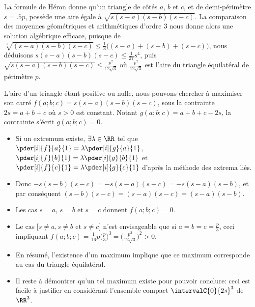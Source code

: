

\begin{remark}
	La formule de Héron donne qu'un triangle de côtés $a$, $b$ et $c$, et de demi-périmètre $s = \num{.5} p$, possède une aire égale à $\sqrt{s(s - a)(s - b)(s - c)}$.
	La comparaison des moyennes géométriques et arithmétiques d'ordre $3$ nous donne alors une solution algébrique efficace, puisque de
	$\sqrt[3]{(s - a)(s - b)(s - c)} \leq \frac13 \big( (s - a) + (s - b) + (s - c) \big)$,
	nous déduisons
	$s(s - a)(s - b)(s - c) \leq \frac{1}{27} s^4$,
	puis
	$\sqrt{s(s - a)(s - b)(s - c)} \leq \frac{p^2}{12 \sqrt{3}}$
	où $\frac{p^2}{12 \sqrt{3}}$ est l'aire du triangle équilatéral de périmètre $p$.
\end{remark}




\begin{remark} \label{constrained-extrema}
	L'aire d'un triangle étant positive ou nulle, nous pouvons chercher à maximiser son carré
	$f(a;b;c) = s(s - a)(s - b)(s - c)$,
	sous la contrainte $2s = a + b + c$ où $s > 0$ est constant.
	Notant $g(a;b;c) = a + b + c - 2 s$, la contrainte s'écrit $g(a;b;c) = 0$.
	\begin{itemize}
		\item Si un extremum existe,
    	$\exists \lambda \in \RR$ tel que
    	$\pder[i]{f}{a}{1} = \lambda \pder[i]{g}{a}{1}$,
    	$\pder[i]{f}{b}{1} = \lambda \pder[i]{g}{b}{1}$ et
    	$\pder[i]{f}{c}{1} = \lambda \pder[i]{g}{c}{1}$
		d'après la méthode des extrema liés.

		\item Donc
		$- s(s - b)(s - c) = - s(s - a)(s - c) = - s(s - a)(s - b)$,
		et par conséquent
		$(s - b)(s - c) = (s - a)(s - c) = (s - a)(s - b)$.

		\item Les cas $s = a$, $s = b$ et $s = c$ donnent $f(a;b;c) = 0$.

		\item Le cas $\big[ s \neq a, s \neq b \text{ et } s \neq c \big]$ n'est envisageable que si $a = b = c = \frac{p}{3}$, ceci impliquant $f(a;b;c) = \frac{1}{16} p \big( \frac{p}{3} \big)^3 = \big( \frac{p^2}{12 \sqrt{3}} \big)^2 > 0$.

		\item En résumé, l'existence d'un maximum implique que ce maximum corresponde au cas du triangle équilatéral.

		\item Il reste à démontrer qu'un tel maximum existe pour pouvoir conclure: ceci est facile à justifier en considérant l'ensemble compact $\intervalC{0}{2s}^3$ de $\RR^3$.
	\end{itemize}
\end{remark}
